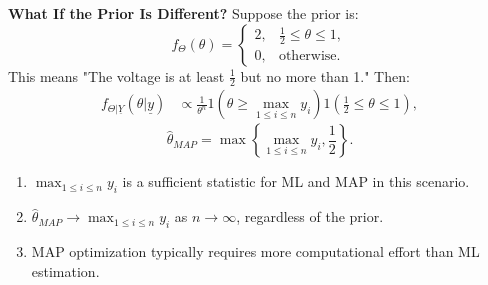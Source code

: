 \begin{example}
    \textbf{What If the Prior Is Different?}
    Suppose the prior is:
    \[
    f_\Theta(\theta) =
    \begin{cases}
        2, & \frac{1}{2} \leq \theta \leq 1, \\
        0, & \text{otherwise}.
    \end{cases}
    \]
    This means "The voltage is at least $\frac{1}{2}$ but no more than 1." Then:
    \begin{align*}
    f_{\Theta|\underline{Y}}(\theta|\underline{y}) &\propto \frac{1}{\theta^n} 1(\theta \geq \max_{1 \leq i \leq n} y_i) 1\left(\frac{1}{2} \leq \theta \leq 1\right),
    \end{align*}
    \[
    \hat{\theta}_{MAP} = \max \left\{\max_{1 \leq i \leq n} y_i, \frac{1}{2}\right\}.
    \]
\end{example}

\begin{notes}
    \begin{enumerate}
        \item $\max_{1 \leq i \leq n} y_i$ is a sufficient statistic for ML and MAP in this scenario.
        \item $\hat{\theta}_{MAP} \to \max_{1 \leq i \leq n} y_i$ as $n \to \infty$, regardless of the prior.
        \item MAP optimization typically requires more computational effort than ML estimation.
    \end{enumerate}
\end{notes}